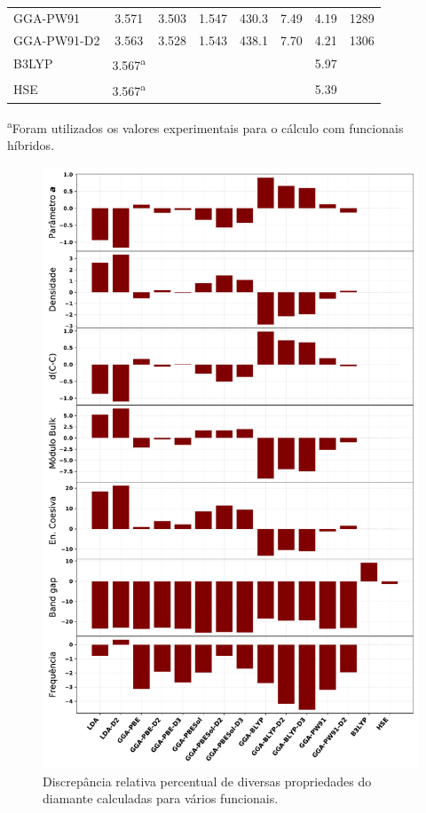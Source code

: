 \begin{table}[]
\begin{tabular}{l|ccccccc}
				GGA-PW91     & 3.571 & 3.503     & 1.547        & 430.3   &  7.49     & 4.19     & 1289         \\
				GGA-PW91-D2  & 3.563 & 3.528     & 1.543        & 438.1   &  7.70     & 4.21     & 1306         \\
				B3LYP        & 3.567\textsuperscript{a} &           &              &         &           & 5.97     &              \\
				HSE          & 3.567\textsuperscript{a} &           &              &         &           & 5.39     &              \\ \hline\hline          
			\end{tabular}
		\textsuperscript{a}Foram utilizados os valores experimentais para o cálculo com funcionais híbridos. 
		\end{table}
		
		\begin{figure}[!h]
			\centering
			\includegraphics[width=.85\linewidth]{capitulos/fig/results0/disc_rel_diamante}
			\caption{Discrepância relativa percentual de diversas propriedades do diamante calculadas para vários funcionais.}
			\label{disc_rel_diamante}
		\end{figure}
	
